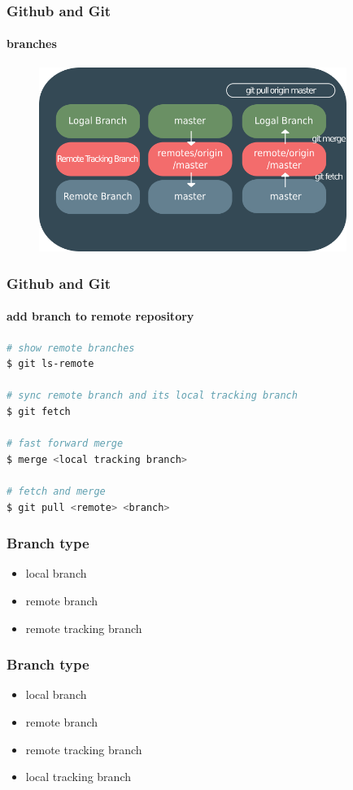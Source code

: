 \documentclass{beamer}
\begin{document}
	\begin{frame}
		\frametitle{Github and Git}
		\framesubtitle{branches}
		\begin{figure}[htbp]
			\centering
			\includegraphics[width=10cm]{remotebranch8}
		\end{figure}
	\end{frame}

	\begin{frame}[fragile]
		\frametitle{Github and Git}
		\framesubtitle{add branch to remote repository}
\begin{lstlisting}[language=bash]
# show remote branches
$ git ls-remote

# sync remote branch and its local tracking branch
$ git fetch

# fast forward merge
$ merge <local tracking branch>

# fetch and merge
$ git pull <remote> <branch>
\end{lstlisting}		
	\end{frame}
	
	\begin{frame}
		\frametitle{Branch type}
		\begin{itemize}
			\item local branch
			\item remote branch
			\item remote tracking branch
		\end{itemize}
	\end{frame}

	\begin{frame}
		\frametitle{Branch type}
		\begin{itemize}
			\item local branch
			\item remote branch
			\item remote tracking branch
			\item local tracking branch		
		\end{itemize}
	\end{frame}
\end{document}
